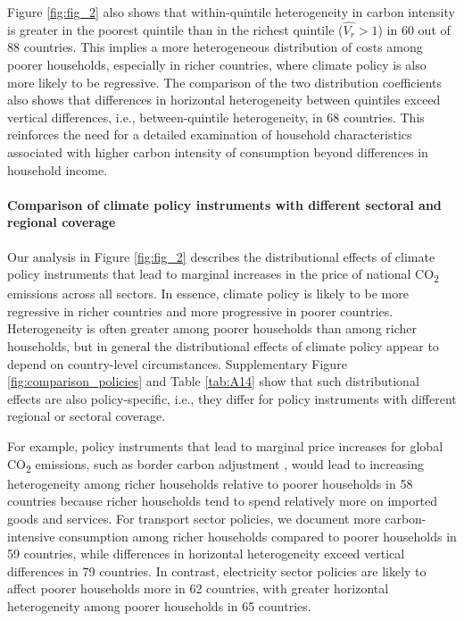 \documentclass[12pt, a4paper]{article}
\begin{document}
Figure \ref{fig:fig_2} also shows that within-quintile heterogeneity in carbon intensity is greater in the poorest quintile than in the richest quintile ($\widehat{V_{r}}>1$) in 60 out of 88 countries. This implies a more heterogeneous distribution of costs among poorer households, especially in richer countries, where climate policy is also more likely to be regressive. The comparison of the two distribution coefficients also shows that differences in horizontal heterogeneity between quintiles exceed vertical differences, i.e., between-quintile heterogeneity, in 68 countries. This reinforces the need for a detailed examination of household characteristics associated with higher carbon intensity of consumption beyond differences in household income.

\paragraph{Comparison of climate policy instruments with different sectoral and regional coverage}

Our analysis in Figure \ref{fig:fig_2} describes the distributional effects of climate policy instruments that lead to marginal increases in the price of national CO\textsubscript{2} emissions across all sectors. In essence, climate policy is likely to be more regressive in richer countries and more progressive in poorer countries. Heterogeneity is often greater among poorer households than among richer households, but in general the distributional effects of climate policy appear to depend on country-level circumstances. Supplementary Figure \ref{fig:comparison_policies} and Table \ref{tab:A14} show that such distributional effects are also policy-specific, i.e., they differ for policy instruments with different regional or sectoral coverage.

For example, policy instruments that lead to marginal price increases for global CO\textsubscript{2} emissions, such as border carbon adjustment \autocite[e.g.,][]{Mehling.2019,Cosbey.2019}, would lead to increasing heterogeneity among richer households relative to poorer households in 58 countries because richer households tend to spend relatively more on imported goods and services. For transport sector policies, we document more carbon-intensive consumption among richer households compared to poorer households in 59 countries, while differences in horizontal heterogeneity exceed vertical differences in 79 countries. In contrast, electricity sector policies are likely to affect poorer households more in 62 countries, with greater horizontal heterogeneity among poorer households in 65 countries. 
\end{document}
